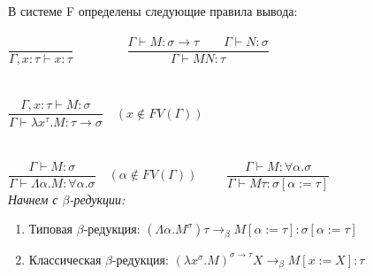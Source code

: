 \documentclass[aspectratio=169]{beamer}
\begin{document}
\begin{frame}
 	В системе F определены следующие правила вывода: \\ \\
  	\noindent
 	{$\dfrac{}{\Gamma,x:\tau\vdash x:\tau}\qquad\qquad$} 
 	{$\dfrac{\Gamma\vdash M:\sigma\rightarrow\tau\qquad\Gamma\vdash N:\sigma}{\Gamma\vdash M N:\tau}$}\\  \\ \\
 	{$\dfrac{\Gamma,x:\tau\vdash M:\sigma}{\Gamma\vdash\lambda x^{\tau}.M:\tau\rightarrow\sigma}\quad(x\notin FV(\Gamma))$}\\ \\ \\
 	{$\dfrac{\Gamma\vdash M:\sigma}{\Gamma\vdash\Lambda\alpha.M:\forall\alpha.\sigma}\quad(\alpha\notin FV(\Gamma))\qquad$}
 	 $\dfrac{\Gamma\vdash M:\forall\alpha.\sigma}{\Gamma\vdash M\tau:\sigma[\alpha:=\tau]}$
 	\\
 	
    \emph{Начнем с $\beta$-редукции:}
    \begin{enumerate}
        \item Типовая $\beta$-редукция: $(\Lambda\alpha.M^{\sigma})\tau\rightarrow_\beta M[\alpha:= \tau]:\sigma[\alpha:= \tau]$
        \item Классическая $\beta$-редукция: $(\lambda x^{\sigma}.M)^{\sigma\rightarrow\tau}X\rightarrow_\beta M[x:=X]:\tau$ 
    \end{enumerate}
 	
\end{frame}
\end{document}
